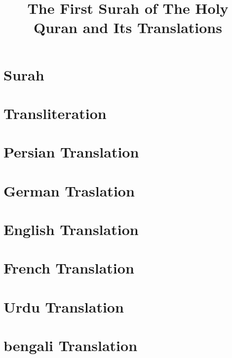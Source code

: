 \documentclass{article}
\title{The First Surah of The Holy Quran and Its Translations}
\author{}\date{}
\begin{document}
\parindent=0pt
\maketitle

\thispagestyle{empty}

\begin{multicols}{2}

    \section*{Surah \surahname[1]}
    \begin{arab}[utf]
        \qurantext
    \end{arab}

    \section*{Transliteration}
    \qurantextlt

    \section{Persian Translation}
    \begin{arab}[utf]
        \qurantextfa
    \end{arab}


    \section{German Traslation}
    \qurantextde

    \section{English Translation}
    \qurantexten

    \section{French Translation}
    \qurantextfr

    \section{Urdu Translation}
    \begin{arab}[utf]
        \qurantextur
    \end{arab}

    \section{bengali Translation}
    {\bengali\qurantextbn}

\end{multicols}
\end{document}
